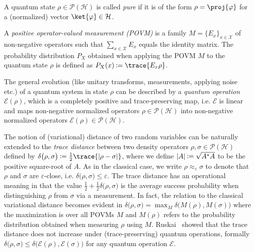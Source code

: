 \documentclass[final,11pt,a4paper]{report}
\newcommand*{\assign}{\ensuremath{\kern.5ex\raisebox{.1ex}{\mbox{\rm:}}\kern -.3em =}}
\newcommand*{\cE}{\mathcal{E}}    %
\newcommand*{\cH}{\mathcal{H}}
\newcommand*{\cX}{\mathcal{X}}
\newcommand*{\set}[1]{\{#1\}}          %
\newcommand*{\dens}[1]{\mathcal{P}(#1)}  %
\newcommand*{\dist}[1]{\delta\big(#1\big)}  %
\newcommand*{\eps}{\varepsilon}
\begin{document}
A quantum state $\rho \in \dens{\cH}$ is called \emph{pure} if it is of the form
$\rho=\proj{\varphi}$ for a (normalized) vector $\ket{\varphi} \in \cH$.

A \emph{positive
  operator-valued measurement (POVM)} is a family $M = \set{E_x}_{x
  \in \cX}$ of non-negative operators such that $\sum_{x \in \cX} E_x$ equals the identity matrix.
The probability distribution $P_X$ obtained when
applying the POVM $M$ to the quantum state $\rho$ is defined as
$P_X(x) \assign \trace{E_x \rho}$.

The general evolution (like unitary transforms, measurements, applying
noise etc.) of a quantum system in state $\rho$ can be described by a
\emph{quantum operation} \index{$\cE(\rho)$
  quantum operation}$\cE(\rho)$, which is a completely positive
and trace-preserving map, i.e. $\cE$ is linear and maps non-negative
normalized operators $\rho \in \dens{\cH}$ into non-negative
normalized operators $\cE(\rho) \in \dens{\cH}$.

The notion of (variational) distance of two random variables can be
naturally extended to the \emph{trace distance} between two density
operators $\rho, \sigma \in \dens{\cH}$ defined by
$\dist{\rho,\sigma} \assign \frac12 \trace{|\rho-\sigma|}$, where we
define $|A| \assign \sqrt{A^* A}$ to be the positive square-root of
$A$. As in the classical case, we write $\rho \approx_{\eps} \sigma$
to denote that $\rho$ and $\sigma$ are $\eps$-close, i.e.
$\dist{\rho,\sigma} \leq \eps$. The trace distance has an operational
meaning in that the value $\frac12 + \frac12 \dist{\rho,\sigma}$ is
the average success probability when distinguishing $\rho$ from
$\sigma$ via a measurement. In fact, the relation to the classical
variational distance becomes evident in $\dist{\rho,\sigma} = \max_M
\dist{M(\rho),M(\sigma)}$ where the maximization is over all POVMs
$M$ and $M(\rho)$ refers to the probability distribution obtained when
measuring $\rho$ using $M$.  Ruskai~\cite{Ruskai94} showed that the trace distance
does not increase under (trace-preserving) quantum operations,
formally $\dist{ \rho,\sigma } \leq \dist{ \cE(\rho),\cE(\sigma) }$ for
any quantum operation $\cE$.
\end{document}
